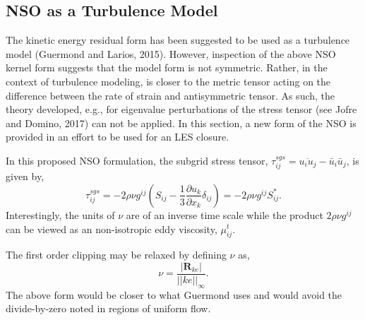 \subsection{NSO as a Turbulence Model}
The kinetic energy residual form has been suggested to be used as a turbulence model (Guermond and Larios, 2015). However,
inspection of the above NSO kernel form suggests that the model form is not symmetric. Rather, in the context of
turbulence modeling, is closer to the metric tensor acting on the difference between the rate of strain and antisymmetric
tensor. As such, the theory developed, e.g., for eigenvalue perturbations of the stress tensor (see Jofre and Domino, 2017) can not be applied. In this section,
a new form of the NSO is provided in an effort to be used for an LES closure.

In this proposed NSO formulation, the subgrid stress tensor, $\tau^{sgs}_{ij} = \overline{u_i u_j} - \bar u_i \bar u_j$, 
is given by,
\begin{equation}
  \tau^{sgs}_{ij} = - 2 \rho \nu g^{ij} (S_{ij} - \frac{1}{3}\frac{\partial u_k} {\partial x_k} \delta_{ij}) 
                = - 2 \rho \nu g^{ij} S^*_{ij}.
\label{nsoTurbForm}
\end{equation}
Interestingly, the units of $\nu$ are of an inverse time scale while the product $2 \rho \nu g^{ij}$ can be viewed
as an non-isotropic eddy viscosity, $\mu^t_{ij}$.

The first order clipping may be relaxed by defining $\nu$ as,
\begin{equation}
  \nu = \frac{| \mathbf{R}_{ke} |} {||ke||_\infty}.
\label{nuTurb}
\end{equation}
The above form would be closer to what Guermond uses and would avoid the divide-by-zero noted in regions of uniform flow.




